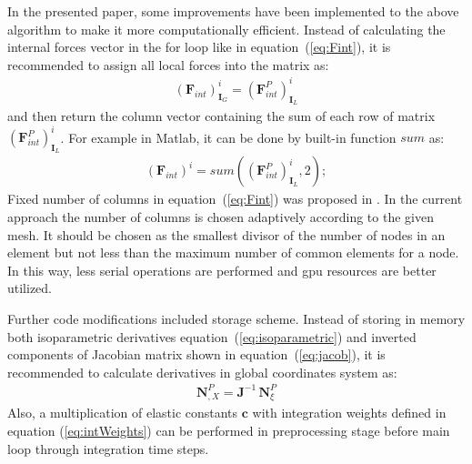In the presented paper, some improvements have been implemented to the above algorithm to make it more computationally efficient.
Instead of calculating the internal forces vector in the for loop like in equation~(\ref{eq:Fint}), it is recommended to assign all local forces into the matrix as:
\begin{eqnarray}
	\label{eq:Fmatrix}
	{\left(\textbf{F}_{int}\right)}^i_{\textbf{I}_G} ={\left(\textbf{F}^P_{int}\right)}^i_{\textbf{I}_L}
\end{eqnarray}
and then return the column vector containing the sum of each row of matrix ${\left(\textbf{F}^P_{int}\right)}^i_{\textbf{I}_L}$.
For example in Matlab, it can be done by built-in function $sum$ as:
\begin{eqnarray}
	\label{eq:Fsum}
	{\left(\textbf{F}_{int}\right)}^i = sum \left({\left(\textbf{F}^P_{int}\right)}^i_{\textbf{I}_L},2\right);
\end{eqnarray}
Fixed number of columns in equation~(\ref{eq:Fint}) was proposed in \cite{kudela2016parallel}. In the current approach the number of columns is chosen adaptively according to the given mesh. It should be chosen as the smallest divisor of the number of nodes in an element but not less than the maximum number of common elements for a node. In this way, less serial operations are performed and \ac{gpu} resources are better utilized.

Further code modifications included storage scheme. Instead of storing in memory both isoparametric derivatives equation~(\ref{eq:isoparametric}) and inverted components of Jacobian matrix shown in equation~(\ref{eq:jacob}), it is recommended to calculate derivatives in global coordinates system as:
\begin{eqnarray}
	\textbf{N}^P_{,X} = \textbf{J}^{-1}\,\textbf{N}^P_{\xi} 
\end{eqnarray}
Also, a multiplication of elastic constants $\textbf{c}$ with integration weights defined in equation (\ref{eq:intWeights}) can be performed in preprocessing stage before main loop through integration time steps.
